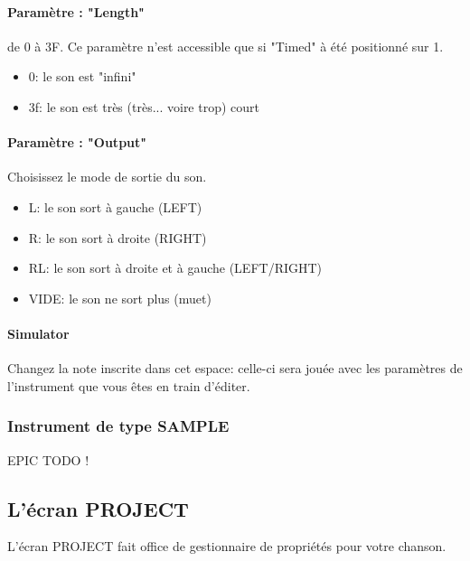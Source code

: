 \documentclass[12pt,a4paper]{article}
\begin{document}
        \paragraph{Paramètre : "Length"} de 0 à 3F. Ce paramètre n'est accessible que si "Timed" à été positionné sur 1.
            \begin{itemize}
                \item{0: le son est "infini"}
                \item{3f: le son est très (très... voire trop) court}
            \end{itemize}
        
        \paragraph{Paramètre : "Output"} Choisissez le mode de sortie du son.
            \begin{itemize}
                \item{L: le son sort à gauche (LEFT)}
                \item{R: le son sort à droite (RIGHT)}
                \item{RL: le son sort à droite et à gauche (LEFT/RIGHT)}
                \item{VIDE: le son ne sort plus (muet)}
            \end{itemize}
        
        \paragraph{Simulator} Changez la note inscrite dans cet espace: celle-ci sera jouée avec les paramètres de l'instrument que vous êtes en train d'éditer.
        
        \subsubsection{Instrument de type SAMPLE}
        
        
        EPIC TODO !
    
    \subsection{L'écran PROJECT}
    
    L'écran PROJECT fait office de gestionnaire de propriétés pour votre chanson. 
    
\end{document}
